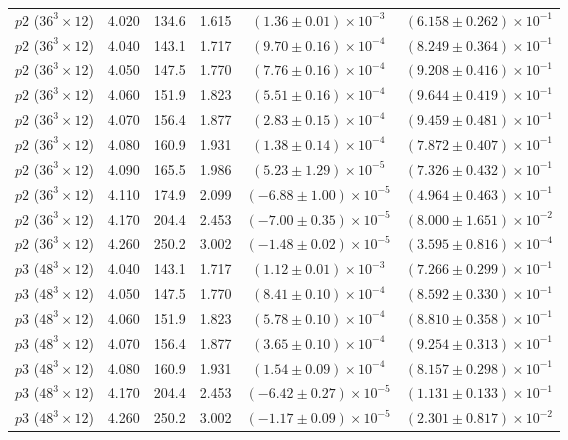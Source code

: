 \documentclass[11pt,a4paper]{article}
\begin{document}
\begin{table}[htbp]
\begin{tabular}{lccccc}
        $p2$ ($36^3\times 12$) & 4.020 & 134.6 & 1.615 & $(1.36 \pm 0.01) \times 10^{-3}$ & $(6.158 \pm 0.262) \times 10^{-1}$ \\
        $p2$ ($36^3\times 12$) & 4.040 & 143.1 & 1.717 & $(9.70 \pm 0.16) \times 10^{-4}$ & $(8.249 \pm 0.364) \times 10^{-1}$ \\
        $p2$ ($36^3\times 12$) & 4.050 & 147.5 & 1.770 & $(7.76 \pm 0.16) \times 10^{-4}$ & $(9.208 \pm 0.416) \times 10^{-1}$ \\
        $p2$ ($36^3\times 12$) & 4.060 & 151.9 & 1.823 & $(5.51 \pm 0.16) \times 10^{-4}$ & $(9.644 \pm 0.419) \times 10^{-1}$ \\
        $p2$ ($36^3\times 12$) & 4.070 & 156.4 & 1.877 & $(2.83 \pm 0.15) \times 10^{-4}$ & $(9.459 \pm 0.481) \times 10^{-1}$ \\
        $p2$ ($36^3\times 12$) & 4.080 & 160.9 & 1.931 & $(1.38 \pm 0.14) \times 10^{-4}$ & $(7.872 \pm 0.407) \times 10^{-1}$ \\
        $p2$ ($36^3\times 12$) & 4.090 & 165.5 & 1.986 & $(5.23 \pm 1.29) \times 10^{-5}$ & $(7.326 \pm 0.432) \times 10^{-1}$ \\
        $p2$ ($36^3\times 12$) & 4.110 & 174.9 & 2.099 & $(-6.88 \pm 1.00) \times 10^{-5}$ & $(4.964 \pm 0.463) \times 10^{-1}$ \\
        $p2$ ($36^3\times 12$) & 4.170 & 204.4 & 2.453 & $(-7.00 \pm 0.35) \times 10^{-5}$ & $(8.000 \pm 1.651) \times 10^{-2}$ \\
        $p2$ ($36^3\times 12$) & 4.260 & 250.2 & 3.002 & $(-1.48 \pm 0.02) \times 10^{-5}$ & $(3.595 \pm 0.816) \times 10^{-4}$ \\
        \midrule
        $p3$ ($48^3\times 12$) & 4.040 & 143.1 & 1.717 & $(1.12 \pm 0.01) \times 10^{-3}$ & $(7.266 \pm 0.299) \times 10^{-1}$ \\
        $p3$ ($48^3\times 12$) & 4.050 & 147.5 & 1.770 & $(8.41 \pm 0.10) \times 10^{-4}$ & $(8.592 \pm 0.330) \times 10^{-1}$ \\
        $p3$ ($48^3\times 12$) & 4.060 & 151.9 & 1.823 & $(5.78 \pm 0.10) \times 10^{-4}$ & $(8.810 \pm 0.358) \times 10^{-1}$ \\
        $p3$ ($48^3\times 12$) & 4.070 & 156.4 & 1.877 & $(3.65 \pm 0.10) \times 10^{-4}$ & $(9.254 \pm 0.313) \times 10^{-1}$ \\
        $p3$ ($48^3\times 12$) & 4.080 & 160.9 & 1.931 & $(1.54 \pm 0.09) \times 10^{-4}$ & $(8.157 \pm 0.298) \times 10^{-1}$ \\
        $p3$ ($48^3\times 12$) & 4.170 & 204.4 & 2.453 & $(-6.42 \pm 0.27) \times 10^{-5}$ & $(1.131 \pm 0.133) \times 10^{-1}$ \\
        $p3$ ($48^3\times 12$) & 4.260 & 250.2 & 3.002 & $(-1.17 \pm 0.09) \times 10^{-5}$ & $(2.301 \pm 0.817) \times 10^{-2}$ \\
        \bottomrule
    \end{tabular}
\end{table}
\end{document}

